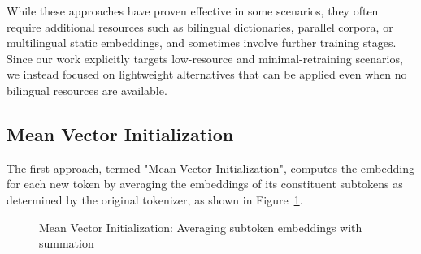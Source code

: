 While these approaches have proven effective in some scenarios, they often require additional resources such as bilingual dictionaries, parallel corpora, or multilingual static embeddings, and sometimes involve further training stages. Since our work explicitly targets low-resource and minimal-retraining scenarios, we instead focused on lightweight alternatives that can be applied even when no bilingual resources are available.

\subsection{Mean Vector Initialization}
\label{subsec:mean-init}
The first approach, termed "Mean Vector Initialization", computes the embedding for each new token by averaging the embeddings of its constituent subtokens as determined by the original tokenizer, as shown in Figure~\ref{fig:mean-init}.


\begin{figure}[ht]
\centering
{}
\caption{Mean Vector Initialization: Averaging subtoken embeddings with summation}
\label{fig:mean-init}
\end{figure}

